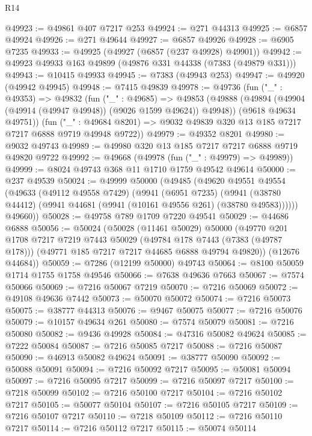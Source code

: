 \begin{lexlean}{R14}
\begin{coremodule}
@49923 := @49861 @407 @7217 @253
@49924 := @271 @44313
@49925 := @6857 @49924
@49926 := @271 @49644
@49927 := @6857 @49926
@49928 := @6905 @7235
@49933 := @49925 (@49927 (@6857 (@237 @49928) @49901))
@49942 := @49923 @49933 @163 @49899 (@49876 @331 @44338 (@7383 (@49879 @331)))
@49943 := @10415 @49933
@49945 := @7383 (@49943 @253)
@49947 := @49920 (@49942 @49945)
@49948 := @7415 @49839
@49978 := @49736
    (fun ("_" : @49353) =>
    @49832
      (fun ("_" : @49685) =>
      @49853
        (@49888 (@49894 (@49904 (@49914 (@49947 @49948)) (@9026 @1599 @49624)) @49948))
        (@9618 @49634 @49751))
      (fun ("_" : @49684 @8201) => @9032 @49839 @320 @13 @185 @7217 @7217 @6888 @9719 @49948 @9722))
@49979 := @49352 @8201
@49980 := @9032 @49743
@49989 := @49980 @320 @13 @185 @7217 @7217 @6888 @9719 @49820 @9722
@49992 := @49668 (@49978 (fun ("_" : @49979) => @49989))
@49999 := @8024 @49743 @368 @11 @1710 @1759 @49542 @49614
@50000 := @237 @49539
@50024 := @49999
    @50000
    (@49485
      (@49620
        @49551
        @49554
        (@49633
          (@49112 @49558 @7429)
          (@9941
            (@6951 @7235)
            (@9941 (@38780 @44412) (@9941 @44681 (@9941 (@10161 @49556 @261) (@38780 @49583))))))
        @49660))
@50028 := @49758 @789 @1709 @7220 @49541
@50029 := @44686 @6888
@50056 := @50024
    (@50028
      (@11461 @50029)
      @50000
      (@49770
        @201
        @1708
        @7217
        @7219
        @7443
        @50029
        (@49784 @178 @7443 (@7383 (@49787 @178)))
        (@49771 @185 @7217 @7217 @44685 @6888 @49794 @49820))
      (@12676 @44684))
@50059 := @7286 (@12199 @50000) @49743
@50064 := @8100 @50059 @1714 @1755 @1758 @49546
@50066 := @7638 @49636 @7663
@50067 := @7574 @50066
@50069 := @7216 @50067 @7219
@50070 := @7216 @50069
@50072 := @49108 @49636 @7442
@50073 := @50070 @50072
@50074 := @7216 @50073
@50075 := @38777 @44313
@50076 := @9467 @50075
@50077 := @7216 @50076
@50079 := @10157 @49634 @261
@50080 := @7574 @50079
@50081 := @7216 @50080
@50082 := @9436 @49928
@50084 := @47316 @50082 @49624
@50085 := @7222 @50084
@50087 := @7216 @50085 @7217
@50088 := @7216 @50087
@50090 := @46913 @50082 @49624
@50091 := @38777 @50090
@50092 := @50088 @50091
@50094 := @7216 @50092 @7217
@50095 := @50081 @50094
@50097 := @7216 @50095 @7217
@50099 := @7216 @50097 @7217
@50100 := @7218 @50099
@50102 := @7216 @50100 @7217
@50104 := @7216 @50102 @7217
@50105 := @50077 @50104
@50107 := @7216 @50105 @7217
@50109 := @7216 @50107 @7217
@50110 := @7218 @50109
@50112 := @7216 @50110 @7217
@50114 := @7216 @50112 @7217
@50115 := @50074 @50114

\end{coremodule}
\end{lexlean}
